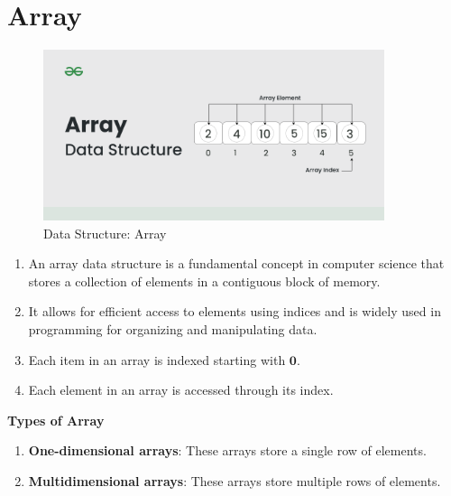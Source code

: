 \section{Array \cite{gfg-array-data-structure-guide}}\label{array}

\begin{table}[h]
    \begin{minipage}{0.35\linewidth}
        \begin{figure}[H]
            \centering
            \includegraphics[width=\linewidth,height=5cm,keepaspectratio]{Pictures/ds-algo/Array-data-structure.png}
            \caption{Data Structure: Array}
        \end{figure}
    \end{minipage}
    \hfill
    \begin{minipage}{0.65\linewidth}
        \begin{enumerate}
            \item An array data structure is a fundamental concept in computer science that stores a collection of elements in a contiguous block of memory.

            \item It allows for efficient access to elements using indices and is widely used in programming for organizing and manipulating data.

            \item Each item in an array is indexed starting with $\mathbf{0}$. 
            
            \item Each element in an array is accessed through its index.
        \end{enumerate}
    \end{minipage}
\end{table}

\noindent \textbf{Types of Array}
\begin{enumerate}
    \item \textbf{One-dimensional arrays}: These arrays store a single row of elements.
    \item \textbf{Multidimensional arrays}: These arrays store multiple rows of elements.
\end{enumerate}


